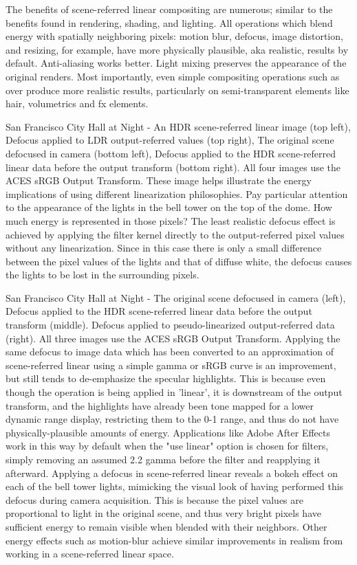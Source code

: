 The benefits of scene-referred linear compositing are numerous; similar to the benefits found in rendering, shading, and lighting. All operations which blend energy with spatially neighboring pixels: motion blur, defocus, image distortion, and resizing, for example, have more physically plausible, aka realistic, results by default. Anti-aliasing works better. Light mixing preserves the appearance of the original renders. Most importantly, even simple compositing operations such as over produce more realistic results, particularly on semi-transparent elements like hair, volumetrics and fx elements.


San Francisco City Hall at Night - An HDR scene-referred linear image (top left), Defocus applied to LDR output-referred values (top right), The original scene defocused in camera (bottom left), Defocus applied to the HDR scene-referred linear data before the output transform (bottom right). All four images use the ACES sRGB Output Transform.
These image helps illustrate the energy implications of using different linearization philosophies. Pay particular attention to the appearance of the lights in the bell tower on the top of the dome. How much energy is represented in those pixels? The least realistic defocus effect is achieved by applying the filter kernel directly to the output-referred pixel values without any linearization. Since in this case there is only a small difference between the pixel values of the lights and that of diffuse white, the defocus causes the lights to be lost in the surrounding pixels.


San Francisco City Hall at Night - The original scene defocused in camera (left), Defocus applied to the HDR scene-referred linear data before the output transform (middle). Defocus applied to pseudo-linearized output-referred data (right). All three images use the ACES sRGB Output Transform.
Applying the same defocus to image data which has been converted to an approximation of scene-referred linear using a simple gamma or sRGB curve is an improvement, but still tends to de-emphasize the specular highlights. This is because even though the operation is being applied in 'linear', it is downstream of the output transform, and the highlights have already been tone mapped for a lower dynamic range display, restricting them to the 0-1 range, and thus do not have physically-plausible amounts of energy. Applications like Adobe After Effects work in this way by default when the "use linear" option is chosen for filters, simply removing an assumed 2.2 gamma before the filter and reapplying it afterward. Applying a defocus in scene-referred linear reveals a bokeh effect on each of the bell tower lights, mimicking the visual look of having performed this defocus during camera acquisition. This is because the pixel values are proportional to light in the original scene, and thus very bright pixels have sufficient energy to remain visible when blended with their neighbors. Other energy effects such as motion-blur achieve similar improvements in realism from working in a scene-referred linear space.

